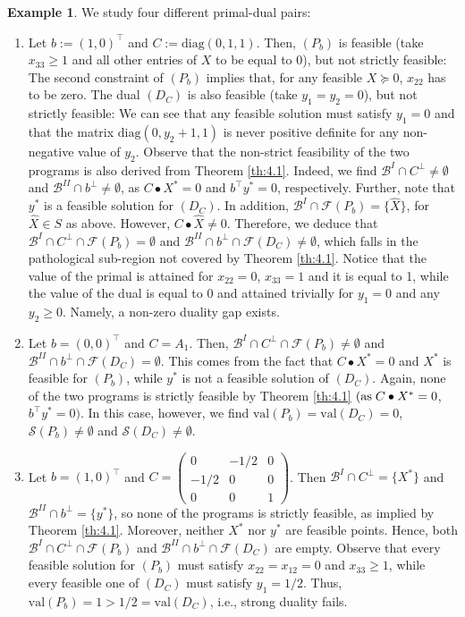 \documentclass[11pt, twoside]{article}
\numberwithin{equation}{section}
\theoremstyle{definition}
\newtheorem{example}{Example}[section]
\begin{document}
\begin{example}
We study four different primal-dual pairs:
\begin{enumerate}
    \item Let $b:=  (1,0)^\top$ and $C:= \text{diag}(0,1,1)$. Then, \hyperlink{pb}{$(P_b)$} is feasible (take $x_{33}\geq 1$ and all other entries of $X$ to be equal to $0$), but not strictly feasible: The second constraint of \hyperlink{pb}{$(P_b)$} implies that, for any feasible $X\succeq 0$, $x_{22}$ has to be zero. The dual \hyperlink{dc}{$(D_C)$} is also feasible (take $y_1=y_2=0$), but not strictly feasible: We can see that any feasible solution must satisfy $y_1=0$ and that the matrix $\text{diag}(0,y_2+1,1)$ is never positive definite for any non-negative value of $y_2$. Observe that the non-strict feasibility of the two programs is also derived from Theorem \ref{th:4.1}. Indeed, we find $\mathcal{B}^{I}\cap C^{\perp}\neq \emptyset$ and  $\mathcal{B}^{II}\cap b^{\perp}\neq\emptyset$, as $C\bullet X^*=0$ and $b^\top y^*=0$, respectively. Further, note that $y^*$ is a feasible solution for \hyperlink{dc}{$(D_C)$}. In addition, $\mathcal{B}^{I}\cap \mathcal{F}(P_b)=\{\hat{X}\}$, for $\hat{X}\in S$ as above. However, $C\bullet\hat{X}\neq 0$. Therefore, we deduce that $\mathcal{B}^{I}\cap C^{\perp}\cap\mathcal{F}(P_b)=\emptyset$ and $\mathcal{B}^{II}\cap b^{\perp}\cap\mathcal{F}(D_C)\neq\emptyset$, which falls in the pathological sub-region not covered by Theorem \ref{th:4.1}. Notice that the value of the primal is attained for $x_{22}=0$, $x_{33}=1$ and it is equal to 1, while the value of the dual is equal to $0$ and attained trivially for $y_1=0$ and any $y_2\geq 0$. Namely, a non-zero duality gap exists. 
\item Let $b=(0,0)^\top$ and $C=A_1$. Then, $\mathcal{B}^{I}\cap C^{\perp}\cap\mathcal{F}(P_b)\neq\emptyset$ and $\mathcal{B}^{II}\cap b^{\perp}\cap \mathcal{F}(D_C)=\emptyset$. This comes from the fact that $C\bullet X^*=0$ and $X^*$ is feasible for \hyperlink{pb}{$(P_b)$}, while $y^*$ is not a feasible solution of \hyperlink{dc}{$(D_C)$}. Again, none of the two programs is strictly feasible by Theorem \ref{th:4.1} $(\mbox{as\;}C\bullet X^*=0$, $b^\top y^*=0)$. In this case, however, we find $\text{val}(P_b)=\text{val}(D_C)=0$, $\mathcal{S}(P_b)\neq\emptyset$ and $\mathcal{S}(D_C)\neq\emptyset$.
\item Let $b=(1,0)^\top$ and $C=\begin{pmatrix}
    0 & -1/2 & 0 \\
    -1/2 & 0 & 0 \\
    0 & 0 & 1
\end{pmatrix}$. Then $\mathcal{B}^{I}\cap C^{\perp}=\{X^*\}$ and $\mathcal{B}^{II}\cap b^{\perp}=\{y^*\}$, so none of the programs is strictly feasible, as implied by Theorem \ref{th:4.1}. Moreover, neither $X^*$ nor $y^*$ are feasible points. Hence, both $\mathcal{B}^{I}\cap C^{\perp}\cap\mathcal{F}(P_b)$ and $\mathcal{B}^{II}\cap b^{\perp}\cap\mathcal{F}(D_C)$ are empty. Observe that every feasible solution for \hyperlink{pb}{$(P_b)$} must satisfy $x_{22}=x_{12}=0$ and $x_{33}\geq 1$, while every feasible one of \hyperlink{dc}{$(D_C)$} must satisfy $y_1=1/2$. Thus, $\text{val}(P_b)=1>1/2=\text{val}(D_C)$, i.e., strong duality fails.

\end{enumerate}
\end{example}
\end{document}
